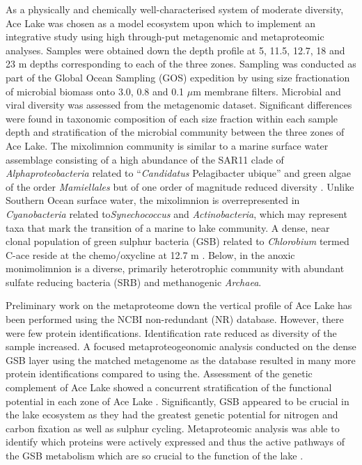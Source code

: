 As a physically and chemically well-characterised system of moderate diversity, Ace Lake was chosen as a model ecosystem upon which to implement an integrative study using high through-put metagenomic and metaproteomic analyses.
Samples were obtained down the depth profile at 5, 11.5, 12.7, 18 and 23 m depths corresponding to each of the three zones.
Sampling was conducted as part of the Global Ocean Sampling (GOS) expedition \cite{Rusch2007} by using size fractionation of microbial biomass onto 3.0, 0.8 and 0.1 $\mu$m membrane filters.
Microbial and viral diversity was assessed from the metagenomic dataset.
Significant differences were found in taxonomic composition of each size fraction within each sample depth and stratification of the microbial community between the three zones of Ace Lake.
The mixolimnion community is similar to a marine surface water assemblage consisting of a high abundance of the SAR11 clade of \emph{Alphaproteobacteria} related to ``\emph{Candidatus} Pelagibacter ubique'' and green algae of the order \emph{Mamiellales} but of one order of magnitude reduced diversity \cite{Lauro2011}.
Unlike Southern Ocean surface water, the mixolimnion is overrepresented in \emph{Cyanobacteria} related to\emph{Synechococcus} and \emph{Actinobacteria}, which may represent taxa that mark the transition of a marine to lake community.
A dense, near clonal population of green sulphur bacteria (GSB) related to \emph{Chlorobium} termed C-ace reside at the chemo/oxycline at 12.7 m \cite{Ng2010, Lauro2011}.
Below, in the anoxic monimolimnion is a diverse, primarily heterotrophic community with abundant sulfate reducing bacteria (SRB) and methanogenic \emph{Archaea}.

Preliminary work on the metaproteome down the vertical profile of Ace Lake has been performed using the NCBI non-redundant (NR) database. %
However, there were few protein identifications.
Identification rate reduced as diversity of the sample increased.
A focused metaproteogeonomic analysis conducted on the dense GSB layer using the matched metagenome as the database resulted in many more protein identifications compared to using the\cite{Ng2010}.
Assessment of the genetic complement of Ace Lake showed a concurrent stratification of the functional potential in each zone of Ace Lake \cite{Lauro2011}.
Significantly, GSB appeared to be crucial in the lake ecosystem as they had the greatest genetic potential for nitrogen and carbon fixation as well as sulphur cycling\cite{Ng2010, Lauro2011}.
Metaproteomic analysis was able to identify which proteins were actively expressed and thus the active pathways of the GSB metabolism which are so crucial to the function of the lake \cite{Ng2010}.

